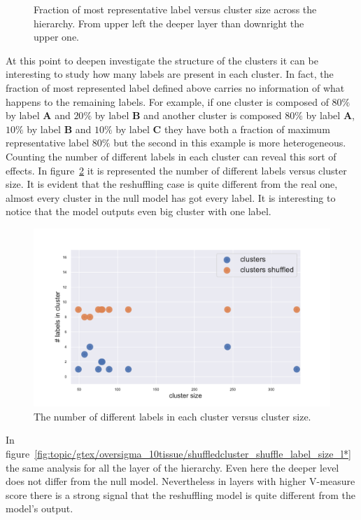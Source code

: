 \begin{figure}[htb!]
\begin{minipage}{0.45\textwidth}
	\end{minipage}
	\caption{Fraction of most representative label versus cluster size across the hierarchy. From upper left the deeper layer than downright the upper one.}
	\label{fig:topic/gtex/oversigma_10tissue/shuffledclusterhomosize_l*}
\end{figure}

At this point to deepen investigate the structure of the clusters it can be interesting to study how many labels are present in each cluster. In fact, the fraction of most represented label defined above carries no information of what happens to the remaining labels. For example, if one cluster is composed of $80\%$ by label \textbf{A} and $20\%$ by label \textbf{B} and another cluster is composed $80\%$ by label \textbf{A}, $10\%$ by label \textbf{B} and $10\%$ by label \textbf{C} they have both a fraction of maximum representative label $80\%$ but the second in this example is more heterogeneous. Counting the number of different labels in each cluster can reveal this sort of effects. In figure~\ref{fig:topic/gtex/oversigma_10tissue/shuffledcluster_shuffle_label_size_l3_primary_site} it is represented the number of different labels versus cluster size. It is evident that the reshuffling case is quite different from the real one, almost every cluster in the null model has got every label. It is interesting to notice that the model outputs even big cluster with one label.
\begin{figure}[htb!]
    \centering
    \includegraphics[width=0.9\linewidth]{pictures/topic/gtex/oversigma_10tissue/shuffledcluster_shuffle_label_size_l3_primary_site.pdf}
    \caption{The number of different labels in each cluster versus cluster size.}
    \label{fig:topic/gtex/oversigma_10tissue/shuffledcluster_shuffle_label_size_l3_primary_site}
\end{figure}
In figure~\ref{fig:topic/gtex/oversigma_10tissue/shuffledcluster_shuffle_label_size_l*} the same analysis for all the layer of the hierarchy. Even here the deeper level does not differ from the null model. Nevertheless in layers with higher V-measure score there is a strong signal that the reshuffling model is quite different from the model's output.
